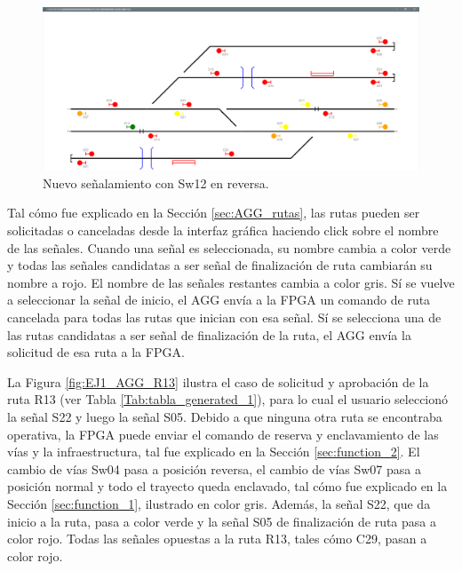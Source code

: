 	\begin{figure}[H]
		\centering
		\includegraphics[origin = c, width=1\textwidth]{resultados-obtenidos/ejemplo1/images/AGG_S32_NO}
		\centering\caption{Nuevo señalamiento con Sw12 en reversa.}
		\label{fig:EJ1_AGG_SW12_REVERSE}
	\end{figure}
	
	Tal cómo fue explicado en la Sección \ref{sec:AGG_rutas}, las rutas pueden ser solicitadas o canceladas desde la interfaz gráfica haciendo click sobre el nombre de las señales. Cuando una señal es seleccionada, su nombre cambia a color verde y todas las señales candidatas a ser señal de finalización de ruta cambiarán su nombre a rojo. El nombre de las señales restantes cambia a color gris. Sí se vuelve a seleccionar la señal de inicio, el AGG envía a la FPGA un comando de ruta cancelada para todas las rutas que inician con esa señal. Sí se selecciona una de las rutas candidatas a ser señal de finalización de la ruta, el AGG envía la solicitud de esa ruta a la FPGA.
	
	La Figura \ref{fig:EJ1_AGG_R13}	ilustra el caso de solicitud y aprobación de la ruta R13 (ver Tabla \ref{Tab:tabla_generated_1}), para lo cual el usuario seleccionó la señal S22 y luego la señal S05. Debido a que ninguna otra ruta se encontraba operativa, la FPGA puede enviar el comando de reserva y enclavamiento de las vías y la infraestructura, tal fue explicado en la Sección \ref{sec:function_2}. El cambio de vías Sw04 pasa a posición reversa, el cambio de vías Sw07 pasa a posición normal y todo el trayecto queda enclavado, tal cómo fue explicado en la Sección \ref{sec:function_1}, ilustrado en color gris. Además, la señal S22, que da inicio a la ruta, pasa a color verde y la señal S05 de finalización de ruta pasa a color rojo. Todas las señales opuestas a la ruta R13, tales cómo C29, pasan a color rojo. 
	
